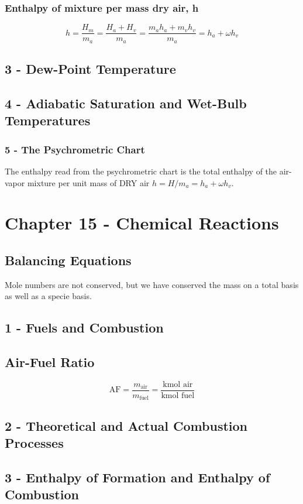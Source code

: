 \documentclass[10pt,landscape]{article}
\begin{document}
\begin{multicols}{3}
\subsubsection{Enthalpy of mixture per mass dry air, h}
\begin{equation}
    h=\frac{H_m}{m_a}=\frac{H_a+H_v}{m_a}=\frac{m_ah_a+m_vh_v}{m_a}=h_a+\omega h_v
\end{equation}
\subsection{3 - Dew-Point Temperature}  
\subsection{4 - Adiabatic Saturation and Wet-Bulb Temperatures}
\subsubsection{5 - The Psychrometric Chart}
\color{red}
The enthalpy read from the psychrometric chart is the total enthalpy of the air-vapor mixture per unit mass of DRY air $h=H/m_a=h_a+\omega h_v$.
\color{black}

\section{Chapter 15 - Chemical Reactions}
\subsection{Balancing Equations}
Mole numbers are not conserved, but we have conserved the mass on a total basis as well as a specie basis.
\subsection{1 - Fuels and Combustion}
\subsection{Air-Fuel Ratio}
\begin{equation}
    \text{AF}=\frac{m_\text{air}}{m_\text{fuel}}=\frac{\text{kmol air}}{\text{kmol fuel}}
\end{equation}
\subsection{2 - Theoretical and Actual Combustion Processes}
\subsection{3 - Enthalpy of Formation and Enthalpy of Combustion}

\end{multicols}
\end{document}
